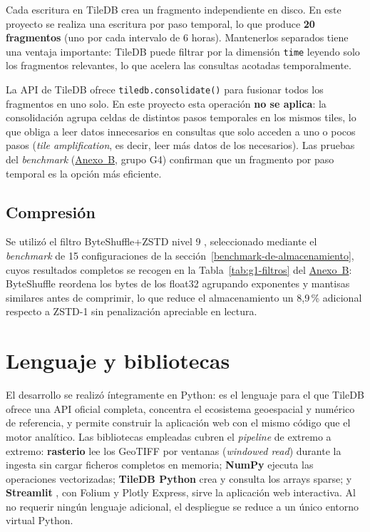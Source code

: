 Cada escritura en TileDB crea un fragmento independiente en disco. En este proyecto se realiza una escritura por paso temporal, lo que produce \textbf{20 fragmentos} (uno por cada intervalo de 6 horas). Mantenerlos separados tiene una ventaja importante: TileDB puede filtrar por la dimensión \texttt{time} leyendo solo los fragmentos relevantes, lo que acelera las consultas acotadas temporalmente.

La API de TileDB ofrece \texttt{tiledb.consolidate()} para fusionar todos los fragmentos en uno solo. En este proyecto esta operación \textbf{no se aplica}: la consolidación agrupa celdas de distintos pasos temporales en los mismos tiles, lo que obliga a leer datos innecesarios en consultas que solo acceden a uno o pocos pasos (\textit{tile amplification}, es decir, leer más datos de los necesarios). Las pruebas del \textit{benchmark} (\hyperref[anexo-b.-tablas-de-resultados-completas]{Anexo~B}, grupo G4) confirman que un fragmento por paso temporal es la opción más eficiente.

\subsection{Compresión}\label{compresion}

Se utilizó el filtro ByteShuffle+ZSTD nivel 9 \cite{tiledb_compression_tutorial, tiledb_compression, tiledb_docs_compression}, seleccionado mediante el \textit{benchmark} de 15 configuraciones de la sección~\ref{benchmark-de-almacenamiento}, cuyos resultados completos se recogen en la Tabla~\ref{tab:g1-filtros} del \hyperref[anexo-b.-tablas-de-resultados-completas]{Anexo~B}: ByteShuffle reordena los bytes de los float32 agrupando exponentes y mantisas similares antes de comprimir, lo que reduce el almacenamiento un 8,9\,\% adicional respecto a ZSTD-1 sin penalización apreciable en lectura.

\section{Lenguaje y bibliotecas}\label{lenguaje-y-librerias}

El desarrollo se realizó íntegramente en Python: es el lenguaje para el que TileDB ofrece una API oficial completa, concentra el ecosistema geoespacial y numérico de referencia, y permite construir la aplicación web con el mismo código que el motor analítico. Las bibliotecas empleadas cubren el \textit{pipeline} de extremo a extremo: \textbf{rasterio} \cite{rasterio} lee los GeoTIFF por ventanas (\textit{windowed read}) durante la ingesta sin cargar ficheros completos en memoria; \textbf{NumPy} \cite{numpy} ejecuta las operaciones vectorizadas; \textbf{TileDB Python} crea y consulta los arrays sparse; y \textbf{Streamlit} \cite{streamlit}, con Folium y Plotly Express, sirve la aplicación web interactiva. Al no requerir ningún lenguaje adicional, el despliegue se reduce a un único entorno virtual Python.



